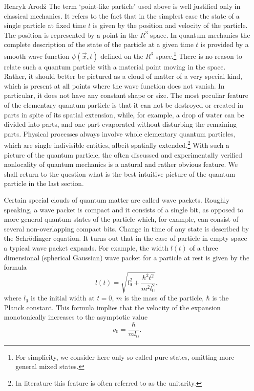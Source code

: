 \begin{artengenv}{Henryk Arod\'z}
The term `point-like particle' used above is well justified only in classical mechanics. It refers to the fact that in the simplest case the state of a single particle at fixed time $t$ is given by the position and velocity of the particle. The position is represented by a point in the $R^3$ space. In quantum mechanics the complete description of the state of the particle at a given time $t$ is provided by a smooth wave function $\psi(\vec{x}, t)$ defined on the $R^3$ space.\footnote{For simplicity, we consider here only so-called pure states, omitting more general mixed states.} 
There is no reason to relate such a quantum particle with a material point moving in the space. Rather, it should better be pictured as a cloud of matter of a very special kind, which is present at all points where the wave function does not vanish. In particular, it does not have any constant shape or size. The most peculiar feature of the elementary quantum particle is that it can not be destroyed or created in parts in spite of its spatial extension, while, for example, a drop of water can be divided into parts, and one part evaporated without disturbing the remaining parts. Physical processes always involve whole elementary quantum particles, which are single indivisible entities, albeit spatially extended.\footnote{In literature this feature is often referred to as the unitarity.} With such a picture of the quantum particle, the often discussed and experimentally verified nonlocality of quantum mechanics is a natural and rather obvious feature. We shall return to the question what is the best intuitive picture of the quantum particle in the last section. 

Certain special clouds of quantum matter are called wave packets. Roughly speaking, a wave packet is compact and it consists of a single bit, as opposed to more general quantum states of the particle which, for example, can consist of several non-overlapping compact bits. 
Change in time of any state is described by the Schr\"odinger equation.
It turns out that in the case of particle in empty space a typical wave packet expands. For example, the width $l(t)$ of a
 three dimensional (spherical Gaussian) wave packet for a particle at rest is given by the formula \parencite[p.66]{qmtext}
\[ l(t) = \sqrt{l^2_0 + \frac{\hbar^2 t^2}{ m^2 l_0^2}}, \]
where $l_0$ is the initial width at $t=0$, $m$ is the mass of the particle, $\hbar$ is the Planck constant. This formula implies that the velocity of the expansion monotonically increases to the asymptotic value
\[ v_0 = \frac{\hbar}{ m l_0}.\]


\end{artengenv}
